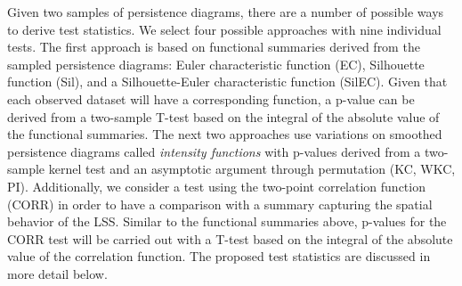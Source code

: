 \documentclass[12pt]{article}
\begin{document}
Given two samples of persistence diagrams, there are a number of possible ways to derive test statistics. We select four possible approaches with nine individual tests. The first approach is based on functional summaries derived from the sampled persistence diagrams: Euler characteristic function (EC), Silhouette function (Sil), and a 
Silhouette-Euler characteristic function (SilEC). Given that each observed dataset will have a corresponding function, a p-value can be derived from 
a two-sample T-test based on the integral of the absolute value of the functional summaries. The next two approaches use variations on smoothed persistence diagrams called \emph{intensity functions} \cite{chen2015statistical} with p-values derived from a two-sample kernel test \cite{gretton2012kernel} and an asymptotic argument through permutation (KC, WKC, PI). Additionally, we consider a test using the two-point correlation function (CORR) in order to have a comparison with a summary capturing the spatial behavior of the LSS. Similar to the functional summaries above, p-values for the CORR test will be carried out with a T-test based on the integral of the absolute value of the correlation function. The proposed test statistics are discussed in more detail below.


\end{document}
